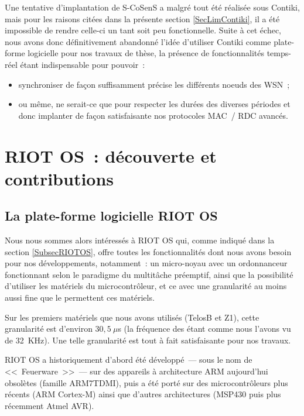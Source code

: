 \label{PtEchecSCosensContiki}
Une tentative d'implantation de S-CoSenS a malgré tout été réalisée
sous Contiki, mais pour les raisons citées dans la présente section
\ref{SecLimContiki}, il a été impossible de rendre celle-ci un tant soit
peu fonctionnelle. Suite à cet échec, nous avons donc définitivement
abandonné l'idée d'utiliser Contiki comme plate-forme logicielle pour
nos travaux de thèse, la présence de fonctionnalités temps-réel étant
indispensable pour pouvoir~:

\begin{itemize}

\item synchroniser de façon suffisamment précise les différents noeuds 
des WSN~;

\item ou même, ne serait-ce que pour respecter les durées des diverses
périodes et donc implanter de façon satisfaisante nos protocoles MAC~/ RDC
avancés.

\end{itemize}


\section{RIOT OS~: découverte et contributions}
\label{SecRIOTContrib}


\subsection{La plate-forme logicielle RIOT OS}
\label{SubSecPFRIOT}

Nous nous sommes alors intéressés à RIOT OS qui, comme indiqué dans
la section \vref{SubsecRIOTOS}, offre toutes les fonctionnalités dont
nous avons besoin pour nos développements, notamment~: un micro-noyau avec
un ordonnanceur fonctionnant selon le paradigme du multitâche préemptif,
ainsi que la possibilité d'utiliser les  matériels du
microcontrôleur, et ce avec une granularité au moins aussi fine
que le permettent ces  matériels.

Sur les premiers matériels que nous avons utilisés (TelosB et Z1), cette
granularité est d'environ $30,5~\mu$s (la fréquence des 
étant comme nous l'avons vu de 32~KHz). Une telle granularité est tout
à fait satisfaisante pour nos travaux.

RIOT OS a historiquement d'abord été développé~--- sous le nom de
<<~Feuerware~>>~--- sur des appareils à architecture ARM aujourd'hui
obsolètes (famille ARM7\-TDMI), puis a été porté sur des microcontrôleurs
plus récents (ARM Cortex-M) ainsi que d'autres architectures (MSP430
puis plus récemment Atmel AVR).

